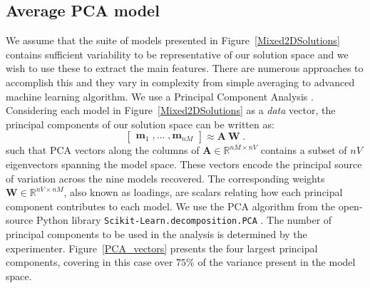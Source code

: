 \documentclass[extra,referee]{gji}
\begin{document}
\subsection{Average PCA model}
We assume that the suite of models presented in Figure~\ref{Mixed2DSolutions} contains sufficient variability to be representative of our solution space and we wish to use these to extract the main features. There are numerous approaches to accomplish this and they vary in complexity from simple averaging to advanced machine learning algorithm.
We use a Principal Component Analysis \cite[]{Pearson1901, Hotelling1933}.
Considering each model in Figure~\ref{Mixed2DSolutions} as a \emph{data} vector, the principal components of our solution space can be written as:
\begin{equation}
\begin{bmatrix}
\mathbf{m}_1\;, ...\;, \mathbf{m}_{nM}
\end{bmatrix} \approx
\mathbf{A\:W}\;.
\end{equation}
such that PCA vectors along the columns of $\mathbf{A} \in \mathbb{R}^{nM \times nV}$ contains a subset of $nV$ eigenvectors spanning the model space. These vectors encode the principal source of variation across the nine models recovered.
The corresponding weights $\mathbf{W} \in \mathbb{R}^{nV \times nM}$, also known as loadings, are scalars relating how each principal component contributes to each model. We use the PCA algorithm from the open-source Python library \texttt{Scikit-Learn.decomposition.PCA} \cite[]{Pedregosa2011}. The number of principal components to be used in the analysis is determined by the experimenter.
Figure~\ref{PCA_vectors} presents the four largest principal components, covering in this case over $75\%$ of the variance present in the model space.
\end{document}

